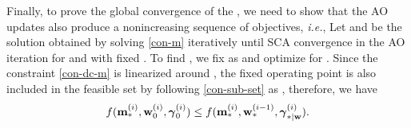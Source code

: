 Finally, to prove the global convergence of the , we need to show that the \ac{AO} updates also produce a nonincreasing sequence of objectives, \textit{i.e.}, 
\iftoggle{single_column}{
\begin{equation}
f(\iter{\mx}{\lpoint}{i},\iter{\my}{0}{i},\iter{\mz}{0}{i}) \leq f(\iter{\mx}{\lpoint}{i},\iter{\my}{\lpoint}{i-1},\iter{\mz}{\lpoint|\my}{i}).
\end{equation}}{
\begin{equation}
f(\iter{\mx}{\lpoint}{i},\iter{\my}{0}{i},\iter{\mz}{0}{i}) \leq f(\iter{\mx}{\lpoint}{i},\iter{\my}{\lpoint}{i-1},\iter{\mz}{\lpoint|\my}{i}).
\end{equation}}
Let  and  be the solution obtained by solving \eqref{con-m} iteratively until \ac{SCA} convergence in the  \ac{AO} iteration for \eqn{\mx} and \eqn{\mz} with fixed . To find , we fix \eqn{\mx} as  and optimize for \me{\my}. Since the constraint \eqref{con-dc-m} is linearized around , the fixed operating point is also included in the feasible set by following \eqref{con-sub-set} as , therefore, we have
\begin{equation} \label{fixed_point}
f(\iter{\mx}{\lpoint}{i},\iter{\my}{0}{i},\iter{\mz}{0}{i}) \leq f(\iter{\mx}{\lpoint}{i},\iter{\my}{\lpoint}{i-1},\iter{\mz}{\lpoint|\my}{i}).
\end{equation}

